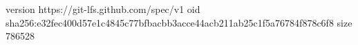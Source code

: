 version https://git-lfs.github.com/spec/v1
oid sha256:e32fec400d57e1c4845c77bfbacbb3acce44acb211ab25c1f5a76784f878c6f8
size 786528
